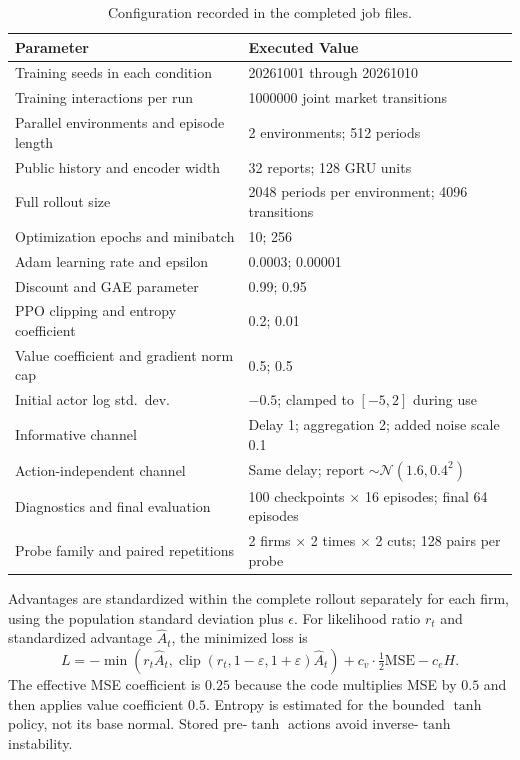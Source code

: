 \documentclass{article}
\begin{document}
\begin{table}[t]
\centering
\caption{Configuration recorded in the completed job files.}
\label{tab:config}
\small
\begin{tabular}{@{}ll@{}}
\toprule
Parameter & Executed Value \\
\midrule
Training seeds in each condition & 20261001 through 20261010 \\
Training interactions per run & \num{1000000} joint market transitions \\
Parallel environments and episode length & 2 environments; 512 periods \\
Public history and encoder width & 32 reports; 128 GRU units \\
Full rollout size & \num{2048} periods per environment; \num{4096} transitions \\
Optimization epochs and minibatch & 10; 256 \\
Adam learning rate and epsilon & \num{0.0003}; \num{0.00001} \\
Discount and GAE parameter & 0.99; 0.95 \\
PPO clipping and entropy coefficient & 0.2; 0.01 \\
Value coefficient and gradient norm cap & 0.5; 0.5 \\
Initial actor log std.\ dev. & $-0.5$; clamped to $[-5, 2]$ during use \\
Informative channel & Delay 1; aggregation 2; added noise scale 0.1 \\
Action-independent channel & Same delay; report $\sim \mathcal{N}(1.6, 0.4^2)$ \\
Diagnostics and final evaluation & 100 checkpoints $\times$ 16 episodes; final 64 episodes \\
Probe family and paired repetitions & 2 firms $\times$ 2 times $\times$ 2 cuts; 128 pairs per probe \\
\bottomrule
\end{tabular}
\end{table}

Advantages are standardized within the complete rollout separately for each firm, using the population standard deviation plus $\epsilon$. For likelihood ratio $r_t$ and standardized advantage $\hat{A}_t$, the minimized loss is
\[
L = -\min(r_t \hat{A}_t, \operatorname{clip}(r_t, 1-\varepsilon, 1+\varepsilon)\hat{A}_t) + c_v \cdot \tfrac{1}{2} \mathrm{MSE} - c_e H.
\]
The effective MSE coefficient is $0.25$ because the code multiplies MSE by $0.5$ and then applies value coefficient $0.5$. Entropy is estimated for the bounded $\tanh$ policy, not its base normal. Stored pre-$\tanh$ actions avoid inverse-$\tanh$ instability.
\end{document}
